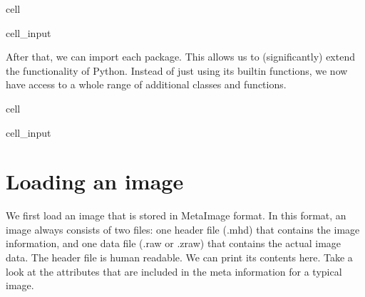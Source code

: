\documentclass[letterpaper,10pt,english]{jupyterBook}
\begin{document}
\begin{sphinxuseclass}{cell}\begin{sphinxVerbatimInput}

\begin{sphinxuseclass}{cell_input}
\begin{sphinxVerbatim}[commandchars=\\\{\}]
  
  
\end{sphinxVerbatim}

\end{sphinxuseclass}\end{sphinxVerbatimInput}

\end{sphinxuseclass}
\sphinxAtStartPar
After that, we can import each package. This allows us to (significantly) extend the functionality of Python. Instead of just using its built\sphinxhyphen{}in functions, we now have access to a whole range of additional classes and functions.

\begin{sphinxuseclass}{cell}\begin{sphinxVerbatimInput}

\begin{sphinxuseclass}{cell_input}
\begin{sphinxVerbatim}[commandchars=\\\{\}]
   
   
   
 
\end{sphinxVerbatim}

\end{sphinxuseclass}\end{sphinxVerbatimInput}

\end{sphinxuseclass}

\section{Loading an image}
\label{\detokenize{notebooks/Tutorial1_NumpySimpleITK/Tutorial1_NumpySimpleITK_student:loading-an-image}}
\sphinxAtStartPar
We first load an image that is stored in MetaImage format. In this format, an image always consists of two files: one header file (.mhd) that contains the image information, and one data file (.raw or .zraw) that contains the actual image data. The header file is human readable. We can print its contents here. Take a look at the attributes that are included in the meta information for a typical image.
\end{document}
